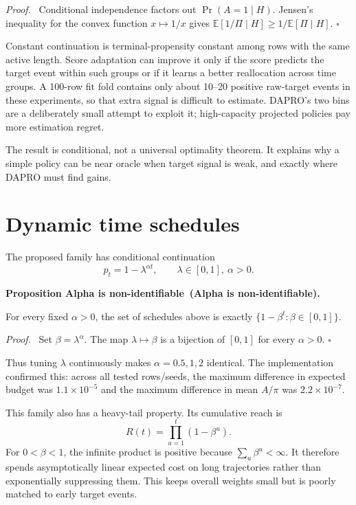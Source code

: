 \documentclass[10pt]{article}
\newcounter{proposition}
\newenvironment{proposition}[1][]{%
  \refstepcounter{proposition}\par\medskip\noindent
  \textbf{Proposition \theproposition\ifx\relax#1\relax\else\ (#1)\fi.}\ \itshape
}{\par\medskip}
\newenvironment{proof}{\par\noindent\textit{Proof.}\ }{\hfill$\square$\par}
\newcommand{\E}{\mathbb{E}}
\begin{document}
\begin{proof}
Conditional independence factors out $\Pr(A=1\mid H)$.  Jensen's inequality
for the convex function $x\mapsto1/x$ gives
$\E[1/\Pi\mid H]\ge1/\E[\Pi\mid H]$.
\end{proof}

Constant continuation is terminal-propensity constant among rows with the
same active length.  Score adaptation can improve it only if the score
predicts the target event within such groups or if it learns a better
reallocation across time groups.  A 100-row fit fold contains only about
10--20 positive raw-target events in these experiments, so that extra signal
is difficult to estimate.  DAPRO's two bins are a deliberately small attempt
to exploit it; high-capacity projected policies pay more estimation regret.

The result is conditional, not a universal optimality theorem.  It explains
why a simple policy can be near oracle when target signal is weak, and exactly
where DAPRO must find gains.

\section{Dynamic time schedules}

The proposed family has conditional continuation
\[
p_t=1-\lambda^{\alpha t},\qquad \lambda\in[0,1],\ \alpha>0.
\]

\begin{proposition}[Alpha is non-identifiable]
For every fixed $\alpha>0$, the set of schedules above is exactly
$\{1-\beta^t:\beta\in[0,1]\}$.
\end{proposition}

\begin{proof}
Set $\beta=\lambda^\alpha$.  The map
$\lambda\mapsto\beta$ is a bijection of $[0,1]$ for every $\alpha>0$.
\end{proof}

Thus tuning $\lambda$ continuously makes $\alpha=0.5,1,2$ identical.  The
implementation confirmed this: across all tested rows/seeds, the maximum
difference in expected budget was $1.1\times10^{-5}$ and the maximum
difference in mean $A/\pi$ was $2.2\times10^{-7}$.

This family also has a heavy-tail property.  Its cumulative reach is
\[
R(t)=\prod_{u=1}^t(1-\beta^u).
\]
For $0<\beta<1$, the infinite product is positive because
$\sum_u\beta^u<\infty$.  It therefore spends asymptotically linear expected
cost on long trajectories rather than exponentially suppressing them.  This
keeps overall weights small but is poorly matched to early target events.
\end{document}
